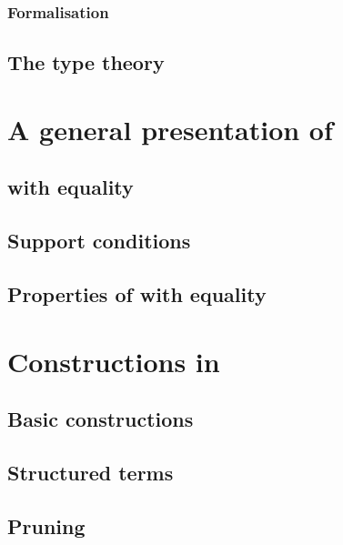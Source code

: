 \documentclass{cam-thesis}
\begin{document}
\subsection{Formalisation}
\label{sec:formalisation}

\section{The type theory \Catt}
\label{sec:type-theory-catt}

\chapter{A general presentation of \Catt}
\label{cha:gener-pres-catt}

\section{\Catt with equality}
\label{sec:catt-with-equality}

\section{Support conditions}
\label{sec:support-conditions}

\section{Properties of \Catt with equality}
\label{sec:properties-catt-with}

\chapter{Constructions in \Catt}
\label{sec:operations-catt}

\section{Basic constructions}
\label{sec:basic-constructions}

\section{Structured terms}
\label{sec:structured-terms}

\section{Pruning}
\label{sec:pruning}
\end{document}
